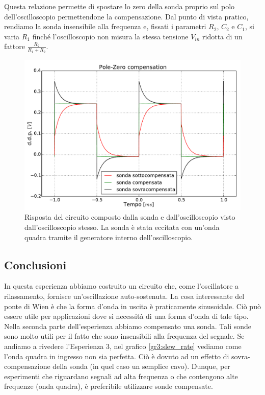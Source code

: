 Questa relazione permette di spostare lo zero della sonda proprio sul polo dell'oscilloscopio permettendone la compensazione.
Dal punto di vista pratico, rendiamo la sonda insensibile alla frequenza e, fissati i parametri $R_2$, $C_2$ e $C_1$, si varia $R_1$ finché l'oscilloscopio non misura la stessa tensione $V_{in}$ ridotta di un fattore $\frac{R_2}{R_1+R_2}$.

\begin{figure}[htpc]
\centering
\includegraphics[width=.65\textwidth]{../E08/latex/compensation.pdf}
\caption{Risposta del circuito composto dalla sonda e dall'oscilloscopio visto dall'oscilloscopio stesso. La sonda è stata eccitata con un'onda quadra tramite il generatore interno dell'oscilloscopio.}
\label{fig8:compensation}
\end{figure}

\subsection*{Conclusioni}
In questa esperienza abbiamo costruito un circuito che, come l'oscillatore a rilassamento, fornisce un'oscillazione auto-sostenuta. La cosa interessante del ponte di Wien è che la forma d'onda in uscita è praticamente sinusoidale. Ciò può essere utile per applicazioni dove si necessità di una forma d'onda di tale tipo. Nella seconda parte dell'esperienza abbiamo compensato una sonda. Tali sonde sono molto utili per il fatto che sono insensibili alla frequenza del segnale. Se andiamo a rivedere l'Esperienza 3, nel grafico \ref{gr3:slew_rate} vediamo come l'onda quadra in ingresso non sia perfetta. Ciò è dovuto ad un effetto di sovra-compensazione della sonda (in quel caso un semplice cavo). Dunque, per esperimenti che riguardano segnali ad alta frequenza o che contengono alte frequenze (onda quadra), è preferibile utilizzare sonde compensate.